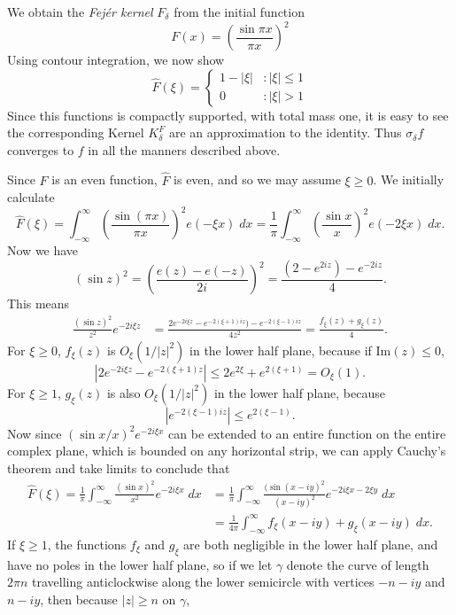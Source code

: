 \begin{example}
	We obtain the {\it Fej\'{e}r kernel} $F_\delta$ from the initial function
	\[ F(x) = \left( \frac{\sin \pi x}{\pi x} \right)^2 \]
	Using contour integration, we now show
	\[ \widehat{F}(\xi) = \begin{cases} 1 - |\xi| & : |\xi| \leq 1\\ 0 &: |\xi| > 1 \end{cases} \]
	Since this functions is compactly supported, with total mass one, it is easy to see the corresponding Kernel $K^F_\delta$ are an approximation to the identity. Thus $\sigma_\delta f$ converges to $f$ in all the manners described above.

	Since $F$ is an even function, $\widehat{F}$ is even, and so we may assume $\xi \geq 0$. We initially calculate
	\[ \widehat{F}(\xi) = \int_{-\infty}^\infty \left( \frac{\sin(\pi x)}{\pi x} \right)^2 e(- \xi x)\; dx = \frac{1}{\pi} \int_{-\infty}^\infty \left( \frac{\sin x}{x} \right)^2 e(- 2 \xi x) \; dx. \]
	Now we have
	\[ (\sin z)^2 = \left( \frac{e(z) - e(-z)}{2i} \right)^2 = \frac{(2 - e^{2iz}) - e^{-2iz}}{4}. \]
	This means
	\begin{align*}
		\frac{(\sin z)^2}{z^2} e^{- 2 i \xi z} &= \frac{2e^{-2 i \xi z} - e^{-2(\xi + 1) i z}) - e^{-2(\xi - 1)iz}}{4z^2 } = \frac{f_\xi(z) + g_\xi(z)}{4}.
	\end{align*}
	For $\xi \geq 0$, $f_\xi(z)$ is $O_\xi(1/|z|^2)$ in the lower half plane, because if $\text{Im}(z) \leq 0$,
	\[ |2e^{-2 i \xi z} - e^{-2(\xi + 1) z}| \leq 2e^{2\xi} + e^{2(\xi + 1)} = O_\xi(1). \]
	For $\xi \geq 1$, $g_\xi(z)$ is also $O_\xi(1/|z|^2)$ in the lower half plane, because
	\[ |e^{-2(\xi - 1)iz}| \leq e^{2(\xi - 1)}.  \]
	Now since $(\sin x/x)^2 e^{-2 i \xi x}$ can be extended to an entire function on the entire complex plane, which is bounded on any horizontal strip, we can apply Cauchy's theorem and take limits to conclude that
	\begin{align*}
		\widehat{F}(\xi) = \frac{1}{\pi} \int_{-\infty}^\infty \frac{(\sin x)^2}{x^2} e^{-2 i \xi x}\; dx &= \frac{1}{\pi} \int_{-\infty}^{\infty} \frac{(\sin (x - iy)^2}{(x - iy)^2} e^{-2 i \xi x  -2 \xi y}\; dx\\
		&= \frac{1}{4 \pi} \int_{-\infty}^\infty f_\xi(x - iy) + g_\xi(x - iy)\; dx.
	\end{align*}
	If $\xi \geq 1$, the functions $f_\xi$ and $g_\xi$ are both negligible in the lower half plane, and have no poles in the lower half plane, so if we let $\gamma$ denote the curve of length $2 \pi n$ travelling anticlockwise along the lower semicircle with vertices $-n - iy$ and $n - iy$, then because $|z| \geq n$ on $\gamma$,

\end{example}
